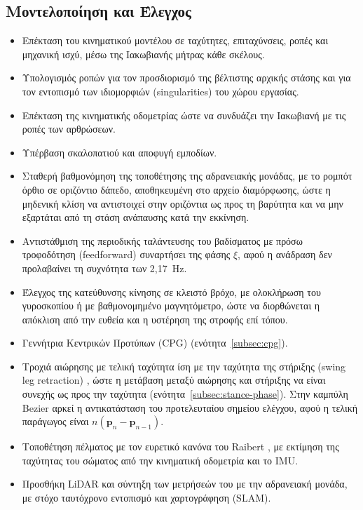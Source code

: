 \documentclass[11pt]{report}
\begin{document}
\subsection{Μοντελοποίηση και Έλεγχος}
\begin{itemize}
  \item Επέκταση του κινηματικού μοντέλου σε ταχύτητες, επιταχύνσεις, ροπές και
  μηχανική ισχύ, μέσω της Ιακωβιανής μήτρας κάθε σκέλους.
  \item Υπολογισμός ροπών για τον προσδιορισμό της βέλτιστης αρχικής στάσης και
  για τον εντοπισμό των ιδιομορφιών (singularities) του χώρου εργασίας.
  \item Επέκταση της κινηματικής οδομετρίας ώστε να συνδυάζει την Ιακωβιανή με
  τις ροπές των αρθρώσεων.
  \item Υπέρβαση σκαλοπατιού και αποφυγή εμποδίων.
  \item Σταθερή βαθμονόμηση της τοποθέτησης της αδρανειακής μονάδας, με το
  ρομπότ όρθιο σε οριζόντιο δάπεδο, αποθηκευμένη στο αρχείο διαμόρφωσης, ώστε η
  μηδενική κλίση να αντιστοιχεί στην οριζόντια ως προς τη βαρύτητα και να μην
  εξαρτάται από τη στάση ανάπαυσης κατά την εκκίνηση.
  \item Αντιστάθμιση της περιοδικής ταλάντευσης του βαδίσματος με πρόσω
  τροφοδότηση (feedforward) συναρτήσει της φάσης $\xi$, αφού η ανάδραση δεν
  προλαβαίνει τη συχνότητα των 2,17~Hz.
  \item Έλεγχος της κατεύθυνσης κίνησης σε κλειστό βρόχο, με ολοκλήρωση του
  γυροσκοπίου ή με βαθμονομημένο μαγνητόμετρο, ώστε να διορθώνεται η απόκλιση
  από την ευθεία και η υστέρηση της στροφής επί τόπου.
  \item Γεννήτρια Κεντρικών Προτύπων (CPG)
  (ενότητα~\ref{subsec:cpg}).
  \item Τροχιά αιώρησης με τελική ταχύτητα ίση με την ταχύτητα της στήριξης
  (swing leg retraction) \cite{haberland}, ώστε η μετάβαση μεταξύ αιώρησης και
  στήριξης να είναι συνεχής ως προς την ταχύτητα
  (ενότητα~\ref{subsec:stance-phase}). Στην καμπύλη Bezier αρκεί η
  αντικατάσταση του προτελευταίου σημείου ελέγχου, αφού η τελική παράγωγος
  είναι $n(\mathbf{p}_n - \mathbf{p}_{n-1})$.
  \item Τοποθέτηση πέλματος με τον ευρετικό κανόνα του Raibert
  \cite{raibert_legged_1986}, με εκτίμηση της ταχύτητας του σώματος από την
  κινηματική οδομετρία και το IMU.
  \item Προσθήκη LiDAR και σύντηξη των μετρήσεών του με την αδρανειακή μονάδα,
  με στόχο ταυτόχρονο εντοπισμό και χαρτογράφηση (SLAM).
\end{itemize}
\end{document}
